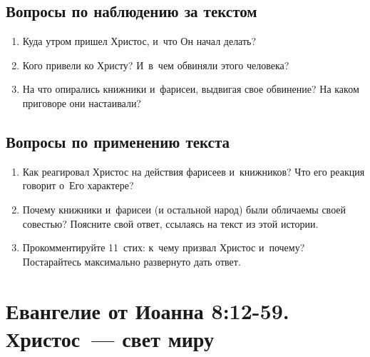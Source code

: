 \documentclass[a4paper,12pt]{article}
\begin{document}
\subsection*{Вопросы по наблюдению за текстом}
\begin{enumerate}
    \item Куда утром пришел Христос, и~что Он начал делать? 
    
    \myline
    
    \myline
    \item Кого привели ко Христу? И~в~чем обвиняли этого человека? 
    
    \myline
    
    \myline
    \item На что опирались книжники и~фарисеи, выдвигая свое обвинение? На каком приговоре они настаивали? 
    
    \myline
    
    \myline
\end{enumerate}

\subsection*{Вопросы по применению текста} 
\begin{enumerate}
    \item Как реагировал Христос на действия фарисеев и~книжников? Что его реакция говорит о~Его характере? 
    
    \myline
    
    \myline
    \item Почему книжники и~фарисеи (и остальной народ) были обличаемы своей совестью? Поясните свой ответ, ссылаясь на текст из этой истории. 
    
    \myline
    
    \myline
    \item Прокомментируйте 11~стих: к~чему призвал Христос и~почему? Постарайтесь максимально развернуто дать ответ. 
    
    \myline
    
    \myline
\end{enumerate}



\section{Евангелие от Иоанна 8:12-59. Христос~--- свет миру}
\end{document}
